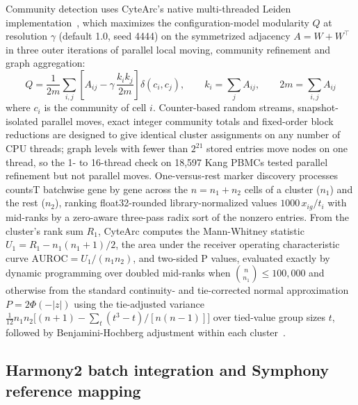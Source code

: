 \documentclass[11pt]{article}
\begin{document}
Community detection uses CyteArc's native multi-threaded Leiden implementation~\cite{traag2019,sahu2023gveleiden}, which maximizes the configuration-model modularity $Q$ at resolution $\gamma$ (default 1.0, seed 4444) on the symmetrized adjacency $A=W+W^{\top}$ in three outer iterations of parallel local moving, community refinement and graph aggregation:
\[
Q=\frac{1}{2m}\sum_{i,j}\left[A_{ij}-\gamma\,\frac{k_ik_j}{2m}\right]\delta\left(c_i,c_j\right),\qquad k_i=\sum_{j}A_{ij},\qquad 2m=\sum_{i,j}A_{ij}
\]
where $c_i$ is the community of cell $i$. Counter-based random streams, snapshot-isolated parallel moves, exact integer community totals and fixed-order block reductions are designed to give identical cluster assignments on any number of CPU threads; graph levels with fewer than $2^{21}$ stored entries move nodes on one thread, so the 1- to 16-thread check on 18,597 Kang PBMCs tested parallel refinement but not parallel moves. One-versus-rest marker discovery processes countsT batchwise gene by gene across the $n=n_1+n_2$ cells of a cluster ($n_1$) and the rest ($n_2$), ranking float32-rounded library-normalized values $1000\,x_{ig}/t_i$ with mid-ranks by a zero-aware three-pass radix sort of the nonzero entries. From the cluster's rank sum $R_1$, CyteArc computes the Mann-Whitney statistic $U_1=R_1-n_1(n_1+1)/2$, the area under the receiver operating characteristic curve $\mathrm{AUROC}=U_1/(n_1n_2)$, and two-sided P values, evaluated exactly by dynamic programming over doubled mid-ranks when $\binom{n}{n_1}\le100{,}000$ and otherwise from the standard continuity- and tie-corrected normal approximation $P=2\Phi(-|z|)$ using the tie-adjusted variance $\frac{1}{12}n_1n_2\bigl[(n+1)-\sum_t(t^{3}-t)/[n(n-1)]\bigr]$ over tied-value group sizes $t$, followed by Benjamini-Hochberg adjustment within each cluster~\cite{benjamini1995controlling}.

\subsection*{Harmony2 batch integration and Symphony reference mapping}\label{sec:Correction and mapping}
\end{document}
